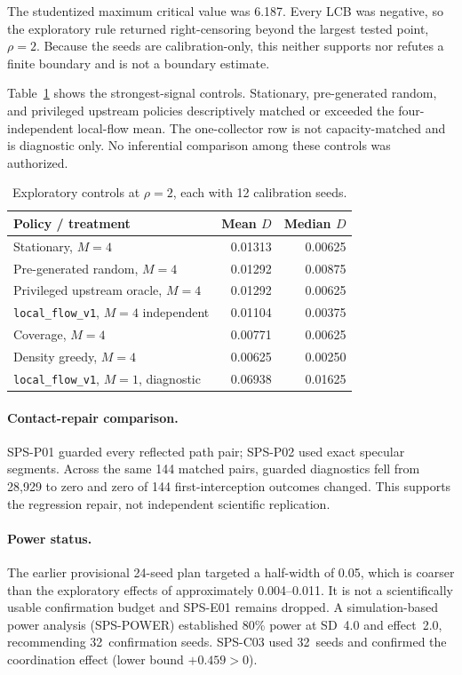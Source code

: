 \documentclass{article}
\begin{document}
The studentized maximum critical value was 6.187. Every LCB was negative, so
the exploratory rule returned right-censoring beyond the largest tested point,
\(\rho=2\). Because the seeds are calibration-only, this neither supports nor
refutes a finite boundary and is not a boundary estimate.

Table~\ref{tab:controls} shows the strongest-signal controls. Stationary,
pre-generated random, and privileged upstream policies descriptively matched
or exceeded the four-independent local-flow mean. The one-collector row is not
capacity-matched and is diagnostic only. No inferential comparison among these
controls was authorized.

\begin{table}[ht]
\centering
\caption{Exploratory controls at \(\rho=2\), each with 12 calibration seeds.}
\label{tab:controls}
\begin{tabular}{lrr}
\toprule
Policy / treatment & Mean \(D\) & Median \(D\) \\
\midrule
Stationary, \(M=4\) & 0.01313 & 0.00625 \\
Pre-generated random, \(M=4\) & 0.01292 & 0.00875 \\
Privileged upstream oracle, \(M=4\) & 0.01292 & 0.00625 \\
\texttt{local\_flow\_v1}, \(M=4\) independent & 0.01104 & 0.00375 \\
Coverage, \(M=4\) & 0.00771 & 0.00625 \\
Density greedy, \(M=4\) & 0.00625 & 0.00250 \\
\texttt{local\_flow\_v1}, \(M=1\), diagnostic & 0.06938 & 0.01625 \\
\bottomrule
\end{tabular}
\end{table}

\paragraph{Contact-repair comparison.}
SPS-P01 guarded every reflected path pair; SPS-P02 used exact specular
segments. Across the same 144 matched pairs, guarded diagnostics fell from
28,929 to zero and zero of 144 first-interception outcomes changed. This
supports the regression repair, not independent scientific replication.

\paragraph{Power status.}
The earlier provisional 24-seed plan targeted a half-width of 0.05, which is
coarser than the exploratory effects of approximately 0.004--0.011. It is not
a scientifically usable confirmation budget and SPS-E01 remains dropped.
A simulation-based power analysis (SPS-POWER) established 80\% power at
SD~4.0 and effect~2.0, recommending 32~confirmation seeds. SPS-C03 used
32~seeds and confirmed the coordination effect (lower bound $+0.459>0$).
\end{document}
